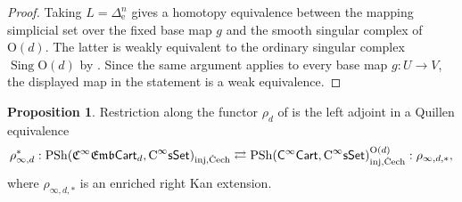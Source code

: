\documentclass{amsart}
\newcommand{\cat}[1]{\mathsf{#1}}
\newcommand{\sset}{\cat{sSet}}
\newcommand{\inj}{\textnormal{inj}}
\newcommand{\Cech}{\textnormal{\v{C}ech}}
\DeclareMathOperator{\Sing}{Sing}
\newcommand{\CsSet}{\textnormal{C}^{\infty}\sset}
\newcommand{\Cart}{\cat{C}^{\infty}\cat{Cart}}
\newcommand{\fembcart}[1]{\mathfrak{C}^{\infty}\mathfrak{Emb}\cat{Cart}_{#1}}
\newcommand{\psh}{\mathrm{PSh}}
\theoremstyle{definition}
\newtheorem{proposition}[equation]{Proposition}
\numberwithin{equation}{subsection}
\numberwithin{subsubsection}{subsection}
\begin{document}
\begin{proof}
  Taking \(L=\Delta^n_{\mathrm{e}}\) gives a homotopy equivalence
  between the mapping simplicial set over the fixed base map \(g\) and the
  smooth singular complex of \(\mathrm{O}(d)\). The latter is weakly
  equivalent to the ordinary singular complex \(\Sing\mathrm{O}(d)\) by
  \cite[Theorem~4.15]{Bun22}. Since the same argument applies to every base
  map \(g:U\to V\), the displayed map in the statement is a weak
  equivalence.
\end{proof}

\begin{proposition}\label{prop:rho.Cech.local.Quillen.equivalence}
  Restriction along the functor \(\rho_d\) of 
  is the left adjoint in a Quillen equivalence
  \[
    \rho_{\infty,d}^{*}:
    \psh(\fembcart{d},\CsSet)_{\inj,\Cech}
    \rightleftarrows
    \psh(\Cart,\CsSet)^{\mathrm{O}(d)}_{\inj,\Cech}
    :\rho_{\infty,d,*},
  \]
  where \(\rho_{\infty,d,*}\) is an enriched right
  Kan extension.
\end{proposition}
\end{document}
